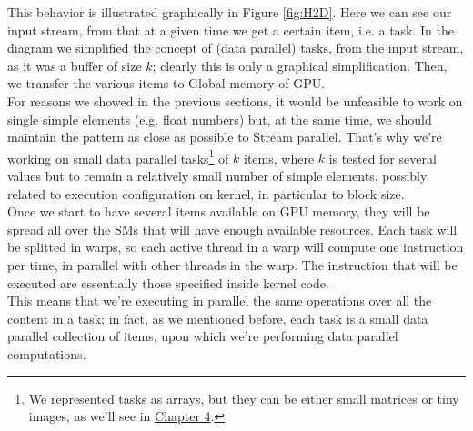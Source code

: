 	This behavior is illustrated graphically in Figure \ref{fig:H2D}. Here we can see our input stream, from that at a given time we get a certain item, i.e. a task. In the diagram we simplified the concept of (data parallel) tasks, from the input stream, as it was a buffer of size \(k\); clearly this is only a graphical simplification. Then, we transfer the various items to Global memory of GPU.\\
	For reasons we showed in the previous sections, it would be unfeasible to work on single simple elements (e.g. float numbers) but, at the same time, we should maintain the pattern as close as possible to Stream parallel. That's why we're working on small data parallel tasks\footnote{We represented tasks as arrays, but they can be either small matrices or tiny images, as we'll see in \hyperref[chap:impl]{Chapter 4}.} of \(k\) items, where \(k\) is tested for several values but to remain a relatively small number of simple elements, possibly related to execution configuration on kernel, in particular to block size.\\

	Once we start to have several items available on GPU memory, they will be spread all over the SMs that will have enough available resources. Each task will be splitted in warps, so each active thread in a warp will compute one instruction per time, in parallel with other threads in the warp. The instruction that will be executed are essentially those specified inside kernel code.\\
	This means that we're executing in parallel the same operations over all the content in a task; in fact, as we mentioned before, each task is a small data parallel collection of items, upon which we're performing data parallel computations.  
	

